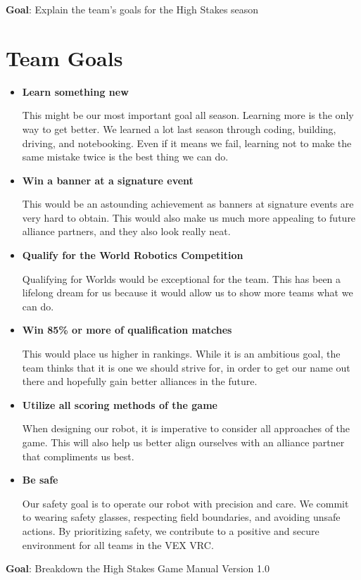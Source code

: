 \label{Team-Goals}
{
\textbf{Goal}: Explain the team's goals for the High Stakes season
\section*{Team Goals}
\begin{itemize}
    \item \textbf{Learn something new}
    
    This might be our most important goal all season. Learning more is the only way to get better. We learned a lot last season through coding, building, driving, and notebooking. Even if it means we fail, learning not to make the same mistake twice is the best thing we can do.
    
    \item \textbf{Win a banner at a signature event}
    
    This would be an astounding achievement as banners at signature events are very hard to obtain. This would also make us much more appealing to future alliance partners, and they also look really neat.
    
    \item \textbf{Qualify for the World Robotics Competition }
    
    Qualifying for Worlds would be exceptional for the team. This has been a lifelong dream for us because it would allow us to show more teams what we can do. 
    
    \item \textbf{Win 85\% or more of qualification matches}
    
    This would place us higher in rankings. While it is an ambitious goal, the team thinks that it is one we should strive for, in order to get our name out there and hopefully gain better alliances in the future. 
    
    \item \textbf{Utilize all scoring methods of the game}
    
    When designing our robot, it is imperative to consider all approaches of the game. This will also help us better align ourselves with an alliance partner that compliments us best.

    \item \textbf{Be safe}

    Our safety goal is to operate our robot with precision and care. We commit to wearing safety glasses, respecting field boundaries, and avoiding unsafe actions. By prioritizing safety, we contribute to a positive and secure environment for all teams in the VEX VRC.
\end{itemize}
}
\label{Identify-Game-Problem}
\textbf{Goal}: Breakdown the High Stakes Game Manual Version 1.0
